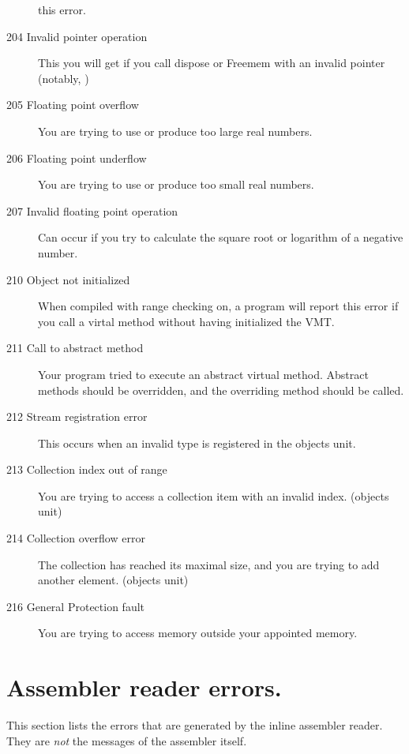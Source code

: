 \documentclass{report}
\begin{document}
\begin{description}
this error.
\item [204  Invalid pointer operation]
This you will get if you call dispose or Freemem with an invalid pointer
(notably, )
\item [205  Floating point overflow]
You are trying to use or produce too large real numbers. 
\item [206  Floating point underflow]
You are trying to use or produce too small real numbers. 
\item [207  Invalid floating point operation]
Can occur if you try to calculate the square root or logarithm of a negative
number.
\item [210  Object not initialized]
When compiled with range checking on, a program will report this error if
you call a virtal method without having initialized the VMT.
\item [211  Call to abstract method]
Your program tried to execute an abstract virtual method. Abstract methods
should be overridden, and the overriding method should be called.
\item [212  Stream registration error]
This occurs when an invalid type is registered in the objects unit.
\item [213  Collection index out of range]
You are trying to access a collection item with an invalid index.
(objects unit) 
\item [214  Collection overflow error]
The collection has reached its maximal size, and you are trying to add
another element. (objects unit)
\item [216  General Protection fault]
You are trying to access memory outside your appointed memory.
\end{description}

\section{Assembler reader errors.}

This section lists the errors that are generated by the inline assembler reader.
They are {\em not} the messages of the assembler itself.

\end{document}
